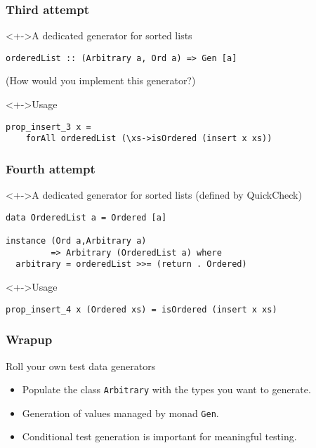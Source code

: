 \documentclass{beamer}
\begin{document}
\begin{frame}[fragile]
  \frametitle{Third attempt}
  \begin{block}<+->{A dedicated generator for sorted lists}
\begin{verbatim}
orderedList :: (Arbitrary a, Ord a) => Gen [a]
\end{verbatim}
    (How would you implement this generator?)
  \end{block}
  \begin{block}<+->{Usage}
\begin{verbatim}
prop_insert_3 x =
    forAll orderedList (\xs->isOrdered (insert x xs))
\end{verbatim}
  \end{block}
\end{frame}
\begin{frame}[fragile]
  \frametitle{Fourth attempt}
  \begin{block}<+->{A dedicated generator for sorted lists (defined by QuickCheck)}
\begin{verbatim}
data OrderedList a = Ordered [a]

instance (Ord a,Arbitrary a)
         => Arbitrary (OrderedList a) where
  arbitrary = orderedList >>= (return . Ordered)
\end{verbatim}
  \end{block}
  \begin{block}<+->{Usage}
\begin{verbatim}
prop_insert_4 x (Ordered xs) = isOrdered (insert x xs)
\end{verbatim}
  \end{block}
\end{frame}
\begin{frame}
  \frametitle{Wrapup}
  \begin{alertblock}{Roll your own test data generators}
  \begin{itemize}
  \item Populate the class \texttt{Arbitrary} with the types you want to generate.
  \item Generation of values managed by monad \texttt{Gen}.
  \item Conditional test generation is important for meaningful testing.
  \end{itemize}
  \end{alertblock}
\end{frame}

\end{document}

